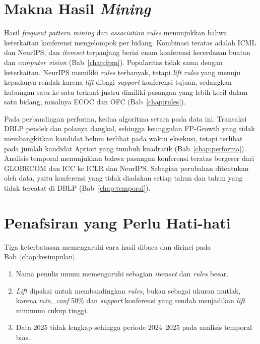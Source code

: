 \section{Makna Hasil \textit{Mining}}
Hasil \textit{frequent pattern mining} dan \textit{association rules} menunjukkan bahwa keterkaitan konferensi mengelompok per bidang. Kombinasi teratas adalah ICML dan NeurIPS, dan \textit{itemset} terpanjang berisi enam konferensi kecerdasan buatan dan \textit{computer vision} (Bab~\ref{chap:fpm}). Popularitas tidak sama dengan keterkaitan. NeurIPS memiliki \textit{rules} terbanyak, tetapi \textit{lift} \textit{rules} yang menuju kepadanya rendah karena \textit{lift} dibagi \textit{support} konferensi tujuan, sedangkan hubungan satu-ke-satu terkuat justru dimiliki pasangan yang lebih kecil dalam satu bidang, misalnya ECOC dan OFC (Bab~\ref{chap:rules}).

Pada perbandingan performa, kedua algoritma setara pada data ini. Transaksi DBLP pendek dan polanya dangkal, sehingga keunggulan FP-Growth yang tidak membangkitkan kandidat belum terlihat pada waktu eksekusi, tetapi terlihat pada jumlah kandidat Apriori yang tumbuh kuadratik (Bab~\ref{chap:performa}). Analisis temporal menunjukkan bahwa pasangan konferensi teratas bergeser dari GLOBECOM dan ICC ke ICLR dan NeurIPS. Sebagian perubahan ditentukan oleh data, yaitu konferensi yang tidak diadakan setiap tahun dan tahun yang tidak tercatat di DBLP (Bab~\ref{chap:temporal}).

\section{Penafsiran yang Perlu Hati-hati}
Tiga keterbatasan memengaruhi cara hasil dibaca dan dirinci pada Bab~\ref{chap:kesimpulan}.
\begin{enumerate}
\item Nama penulis umum memengaruhi sebagian \textit{itemset} dan \textit{rules} besar.
\item \textit{Lift} dipakai untuk membandingkan \textit{rules}, bukan sebagai ukuran mutlak, karena \textit{min\_conf} 50\% dan \textit{support} konferensi yang rendah menjadikan \textit{lift} minimum cukup tinggi.
\item Data 2025 tidak lengkap sehingga periode 2024--2025 pada analisis temporal bias.
\end{enumerate}
